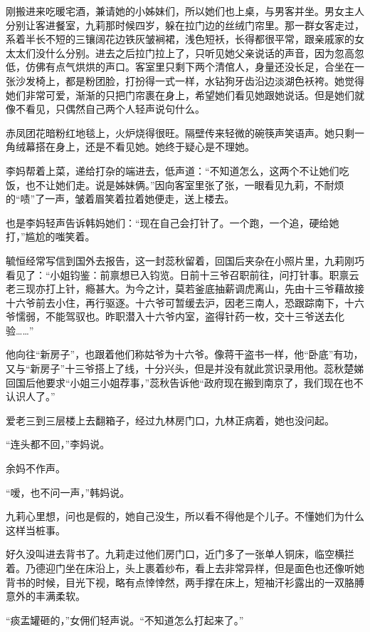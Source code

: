 \par 刚搬进来吃暖宅酒，兼请她的小姊妹们，所以她们也上桌，与男客并坐。男女主人分别让客进餐室，九莉那时候四岁，躲在拉门边的丝绒门帘里。那一群女客走过，系着半长不短的三镶阔花边铁灰皱裥裙，浅色短袄，长得都很平常，跟亲戚家的女太太们没什么分别。进去之后拉门拉上了，只听见她父亲说话的声音，因为忽高忽低，仿佛有点气烘烘的声口。客室里只剩下两个清倌人，身量还没长足，合坐在一张沙发椅上，都是粉团脸，打扮得一式一样，水钻狗牙齿沿边淡湖色袄袴。她觉得她们非常可爱，渐渐的只把门帘裹在身上，希望她们看见她跟她说话。但是她们就像不看见，只偶然自己两个人轻声说句什么。
\par 赤凤团花暗粉红地毯上，火炉烧得很旺。隔壁传来轻微的碗筷声笑语声。她只剩一角绒幕搭在身上，还是不看见她。她终于疑心是不理她。
\par 李妈帮着上菜，递给打杂的端进去，低声道：“不知道怎么，这两个不让她们吃饭，也不让她们走。说是姊妹俩。”因向客室里张了张，一眼看见九莉，不耐烦的“啧”了一声，皱着眉笑着拉着她便走，送上楼去。
\par 也是李妈轻声告诉韩妈她们：“现在自己会打针了。一个跑，一个追，硬给她打，”尴尬的嗤笑着。
\par 毓恒经常写信到国外去报告，这一封蕊秋留着，回国后夹杂在小照片里，九莉刚巧看见了：“小姐钧鉴：前禀想已入钧览。日前十三爷召职前往，问打针事。职禀云老三现亦打上针，瘾甚大。为今之计，莫若釜底抽薪调虎离山，先由十三爷藉故接十六爷前去小住，再行驱逐。十六爷可暂缓去沪，因老三南人，恐跟踪南下，十六爷懦弱，不能驾驭也。昨职潜入十六爷内室，盗得针药一枚，交十三爷送去化验……”
\par 他向往“新房子”，也跟着他们称姑爷为十六爷。像蒋干盗书一样，他“卧底”有功，又与“新房子”十三爷搭上了线，十分兴头，但是并没有就此赏识录用他。蕊秋楚娣回国后他要求“小姐三小姐荐事，”蕊秋告诉他“政府现在搬到南京了，我们现在也不认识人了。”
\par 爱老三到三层楼上去翻箱子，经过九林房门口，九林正病着，她也没问起。
\par “连头都不回，”李妈说。
\par 余妈不作声。
\par “嗳，也不问一声，”韩妈说。
\par 九莉心里想，问也是假的，她自己没生，所以看不得他是个儿子。不懂她们为什么这样当桩事。
\par 好久没叫进去背书了。九莉走过他们房门口，近门多了一张单人铜床，临空横拦着。乃德迎门坐在床沿上，头上裹着纱布，看上去非常异样，但是面色也还像听她背书的时候，目光下视，略有点悻悻然，两手撑在床上，短袖汗衫露出的一双胳膊意外的丰满柔软。
\par “痰盂罐砸的，”女佣们轻声说。“不知道怎么打起来了。”
